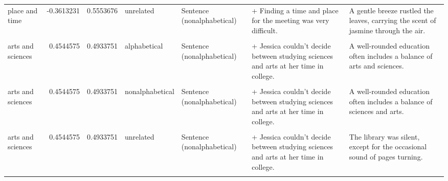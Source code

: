 \documentclass[
  12pt,
]{scrartcl}
\begin{document}
\begin{landscape}
\begin{longtable}{lrrllll}
place and time & -0.3613231 & 0.5553676 & unrelated & Sentence (nonalphabetical) & + Finding a time and place for the meeting was very difficult. & A gentle breeze rustled the leaves, carrying the scent of jasmine through the air.\\
\addlinespace
\cellcolor{gray!6}{arts and sciences} & \cellcolor{gray!6}{0.4544575} & \cellcolor{gray!6}{0.4933751} & \cellcolor{gray!6}{alphabetical} & \cellcolor{gray!6}{Sentence (alphabetical)} & \cellcolor{gray!6}{+ Jessica couldn't decide between studying arts and sciences at her time in college.} & \cellcolor{gray!6}{A well-rounded education often includes a balance of arts and sciences.}\\
arts and sciences & 0.4544575 & 0.4933751 & alphabetical & Sentence (nonalphabetical) & + Jessica couldn't decide between studying sciences and arts at her time in  college. & A well-rounded education often includes a balance of arts and sciences.\\
\cellcolor{gray!6}{arts and sciences} & \cellcolor{gray!6}{0.4544575} & \cellcolor{gray!6}{0.4933751} & \cellcolor{gray!6}{nonalphabetical} & \cellcolor{gray!6}{Sentence (alphabetical)} & \cellcolor{gray!6}{+ Jessica couldn't decide between studying arts and sciences at her time in college.} & \cellcolor{gray!6}{A well-rounded education often includes a balance of sciences and arts.}\\
arts and sciences & 0.4544575 & 0.4933751 & nonalphabetical & Sentence (nonalphabetical) & + Jessica couldn't decide between studying sciences and arts at her time in  college. & A well-rounded education often includes a balance of sciences and arts.\\
\cellcolor{gray!6}{arts and sciences} & \cellcolor{gray!6}{0.4544575} & \cellcolor{gray!6}{0.4933751} & \cellcolor{gray!6}{unrelated} & \cellcolor{gray!6}{Sentence (alphabetical)} & \cellcolor{gray!6}{+ Jessica couldn't decide between studying arts and sciences at her time in college.} & \cellcolor{gray!6}{The library was silent, except for the occasional sound of pages turning.}\\
\addlinespace
arts and sciences & 0.4544575 & 0.4933751 & unrelated & Sentence (nonalphabetical) & + Jessica couldn't decide between studying sciences and arts at her time in  college. & The library was silent, except for the occasional sound of pages turning.\\
\cellcolor{gray!6}{development and research} & \cellcolor{gray!6}{-0.4807498} & \cellcolor{gray!6}{0.2293127} & \cellcolor{gray!6}{alphabetical} & \cellcolor{gray!6}{Sentence (alphabetical)} & \cellcolor{gray!6}{+ Emily was in development and research but eventually decided to leave.} & \cellcolor{gray!6}{Many years of development and research went into the company's new product.}\\

\end{longtable}
\end{landscape}
\end{document}
